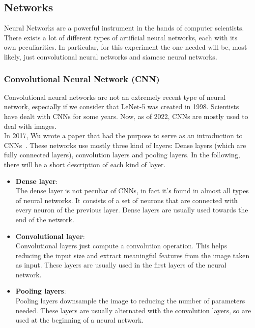 \documentclass[conference]{IEEEtran}
\begin{document}
		\subsection{Networks}
		
			Neural Networks are a powerful instrument in the hands of computer scientists. There exists a lot of different types of artificial neural networks, each with its own peculiarities. In particular, for this 
			experiment the one needed will be, most likely, just convolutional neural networks and siamese neural networks. 
		
			\subsubsection{Convolutional Neural Network (CNN)}
			
				Convolutional neural networks are not an extremely recent type of neural network, especially if we consider that LeNet-5 was created in 1998. Scientists have dealt with CNNs for some years. Now, as of 2022, 
				CNNs are mostly used to deal with images.\\
				In 2017, Wu wrote a paper that had the purpose to serve as an introduction to CNNs~\cite{10}. These networks use mostly three kind of layers: Dense layers (which are fully connected layers), 
				convolution layers and pooling layers. In the following, there will be a short description of each kind of layer. 
				\begin{itemize}
					
					\item \textbf{Dense layer}:\\
						The dense layer is not peculiar of CNNs, in fact it's found in almost all types of neural networks. It consists of a set of neurons that are connected with every neuron of the previous 
						layer. Dense layers are usually used towards the end of the network.
					
					\item \textbf{Convolutional layer}:\\
						Convolutional layers just compute a convolution operation. This helps reducing the input size and extract meaningful features from the image taken as input. These layers are usually used 
						in the first layers of the neural network.
					
					\item \textbf{Pooling layers}:\\
						Pooling layers downsample the image to reducing the number of parameters needed. These layers are usually alternated with the convolution layers, so are used at the beginning of a neural network.
						
				\end{itemize}
				
\end{document}
